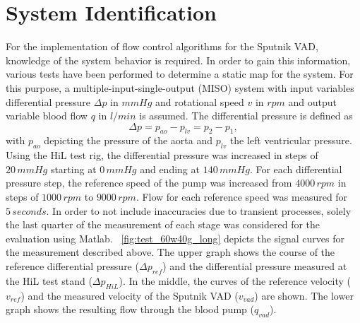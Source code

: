 \section{System Identification}
For the implementation of flow control algorithms for the Sputnik VAD, knowledge of the system behavior is required. In order to gain this information, various tests have been performed to determine a static map for the system. For this purpose, a multiple-input-single-output (MISO) system with input variables differential pressure $\Delta{p}$ in $mmHg$  and rotational speed $v$ in $rpm$ and output variable blood flow $q$ in $l/min$ is assumed. The differential pressure is defined as
\begin{equation}
  \Delta{p} = p_{ao} - p_{lv} = p_2 - p_1,
\end{equation}
with $p_{ao}$ depicting the pressure of the aorta and $p_{lv}$ the left ventricular pressure.
\\Using the HiL test rig, the differential pressure was increased in steps of $20\, mmHg$ starting at $0\,mmHg$ and ending at $140\,mmHg$. For each differential pressure step, the reference speed of the pump was increased from $4000\, rpm$ in steps of $1000\, rpm$ to $9000\, rpm$. Flow for each reference speed was measured for $5\, seconds$. In order to not include inaccuracies due to transient processes, solely the last quarter of the measurement of each stage was considered for the evaluation using Matlab. \figurename~\ref{fig:test_60w40g_long} depicts the signal curves for the measurement described above. The upper graph shows the course of the reference differential pressure ($\Delta{p_{ref}}$) and the differential pressure measured at the HiL test stand ($\Delta{p_{HiL}}$).
In the middle, the curves of the reference velocity ($v_{ref}$) and the measured velocity of the Sputnik VAD ($v_{vad}$) are shown. The lower graph shows the resulting flow through the blood pump ($q_{vad}$).


